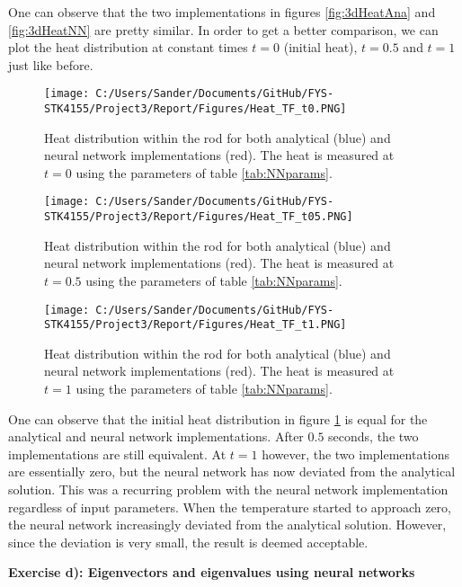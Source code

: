 \documentclass[12pt,a4paper]{article}
\begin{document}
\noindent One can observe that the two implementations in figures \ref{fig:3dHeatAna} and \ref{fig:3dHeatNN} are pretty similar. In order to get a better comparison, we can plot the heat distribution at constant times $t = 0$ (initial heat), $t = 0.5$ and $t = 1$ just like before.

\begin{figure}[H]
\centering
\texttt{[image: C:/Users/Sander/Documents/GitHub/FYS-STK4155/Project3/Report/Figures/Heat\_TF\_t0.PNG]}
\caption{\label{fig:rodHeatTF0} Heat distribution within the rod for both analytical (blue) and neural network implementations (red). The heat is measured at $t = 0$ using the parameters of table \ref{tab:NNparams}.}
\end{figure}

\begin{figure}[H]
\centering
\texttt{[image: C:/Users/Sander/Documents/GitHub/FYS-STK4155/Project3/Report/Figures/Heat\_TF\_t05.PNG]}
\caption{\label{fig:rodHeatTF05} Heat distribution within the rod for both analytical (blue) and neural network implementations (red). The heat is measured at $t = 0.5$ using the parameters of table \ref{tab:NNparams}.}
\end{figure}

\begin{figure}[H]
\centering
\texttt{[image: C:/Users/Sander/Documents/GitHub/FYS-STK4155/Project3/Report/Figures/Heat\_TF\_t1.PNG]}
\caption{\label{fig:rodHeatTF1} Heat distribution within the rod for both analytical (blue) and neural network implementations (red). The heat is measured at $t = 1$ using the parameters of table \ref{tab:NNparams}.}
\end{figure}

\noindent One can observe that the initial heat distribution in figure \ref{fig:rodHeatTF0} is equal for the analytical and neural network implementations. After $0.5$ seconds, the two implementations are still equivalent. At $t = 1$ however, the two implementations are essentially zero, but the neural network has now deviated from the analytical solution. This was a recurring problem with the neural network implementation regardless of input parameters. When the temperature started to approach zero, the neural network increasingly deviated from the analytical solution. However, since the deviation is very small, the result is deemed acceptable. 

\newpage

\begin{center}
\Large{\textbf{Exercise d): Eigenvectors and eigenvalues using neural networks}}
\end{center}
\end{document}
